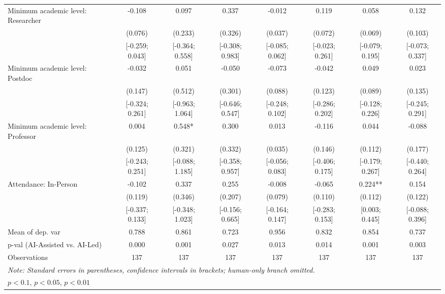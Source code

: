 \begin{tabular}{l*{7}{c}}
Minimum academic level: Researcher&      -0.108   &       0.097   &       0.337   &      -0.012   &       0.119   &       0.058   &       0.132   \\
                    &     (0.076)   &     (0.233)   &     (0.326)   &     (0.037)   &     (0.072)   &     (0.069)   &     (0.103)   \\
                    &[-0.259; 0.043]   &[-0.364; 0.558]   &[-0.308; 0.983]   &[-0.085; 0.062]   &[-0.023; 0.261]   &[-0.079; 0.195]   &[-0.073; 0.337]   \\
Minimum academic level: Postdoc&      -0.032   &       0.051   &      -0.050   &      -0.073   &      -0.042   &       0.049   &       0.023   \\
                    &     (0.147)   &     (0.512)   &     (0.301)   &     (0.088)   &     (0.123)   &     (0.089)   &     (0.135)   \\
                    &[-0.324; 0.261]   &[-0.963; 1.064]   &[-0.646; 0.547]   &[-0.248; 0.102]   &[-0.286; 0.202]   &[-0.128; 0.226]   &[-0.245; 0.291]   \\
Minimum academic level: Professor&       0.004   &       0.548*  &       0.300   &       0.013   &      -0.116   &       0.044   &      -0.088   \\
                    &     (0.125)   &     (0.321)   &     (0.332)   &     (0.035)   &     (0.146)   &     (0.112)   &     (0.177)   \\
                    &[-0.243; 0.251]   &[-0.088; 1.185]   &[-0.358; 0.957]   &[-0.056; 0.083]   &[-0.406; 0.175]   &[-0.179; 0.267]   &[-0.440; 0.264]   \\
Attendance: In-Person&      -0.102   &       0.337   &       0.255   &      -0.008   &      -0.065   &       0.224** &       0.154   \\
                    &     (0.119)   &     (0.346)   &     (0.207)   &     (0.079)   &     (0.110)   &     (0.112)   &     (0.122)   \\
                    &[-0.337; 0.133]   &[-0.348; 1.023]   &[-0.156; 0.665]   &[-0.164; 0.147]   &[-0.283; 0.153]   &[0.003; 0.445]   &[-0.088; 0.396]   \\
\hline
Mean of dep. var    &       0.788   &       0.861   &       0.723   &       0.956   &       0.832   &       0.854   &       0.737   \\
p-val (AI-Assisted vs. AI-Led)&       0.000   &       0.001   &       0.027   &       0.013   &       0.014   &       0.001   &       0.003   \\
Observations        &         137   &         137   &         137   &         137   &         137   &         137   &         137   \\
\hline\hline
\multicolumn{8}{l}{\it{Note:} Standard errors in parentheses, confidence intervals in brackets; human-only branch omitted.}\\
\multicolumn{8}{l}{\sym{*} \(p<0.1\), \sym{**} \(p<0.05\), \sym{***} \(p<0.01\)}\\
\end{tabular}
